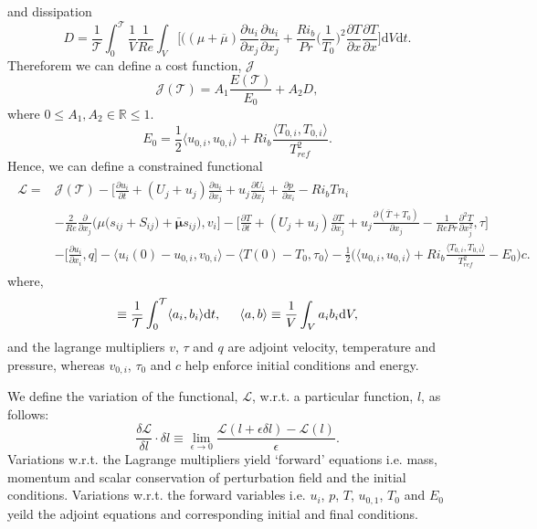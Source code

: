 \documentclass[preprint,12pt]{article}
\begin{document}
and dissipation
\begin{equation}
D=\frac{1}{\mathcal{T}}\int_{0}^{\mathcal{T}}\frac{1}{V}\frac{1}{Re}\int_V\Bigg[\Big((\mu+\overline{\mu})\frac{\partial u_{i}}{\partial x_j}\frac{\partial u_{i}}{\partial x_j}+\frac{Ri_b}{Pr}\Big(\frac{1}{T_0}\Big)^2{\frac{\partial T}{\partial x}\frac{\partial T}{\partial x}}\Bigg]\text{d}V\text{d}t.
\end{equation}
Thereforem we can define a cost function, $\mathcal{J}$
\begin{equation}
\mathcal{J}(\mathcal{T})=A_1\frac{E(\mathcal{T})}{E_0}+A_2D,
\end{equation}
where $0\le A_1,A_2\in\mathbb{R}\le 1$.
\begin{equation}
E_0=\frac{1}{2}\Big\langle u_{0,i},u_{0,i}\Big\rangle+Ri_b \frac{\langle T_{0,i},T_{0,i}\rangle}{T_{ref}^2}.
\end{equation}
Hence, we can define a constrained functional
\begin{align}\begin{split}
\mathcal{L}=&\mathcal{J}(\mathcal{T})-\Bigg[\frac{\partial{u_i}}{\partial{t}}+(U_j+u_j)\frac{\partial u_i}{\partial x_j} +u_j\frac{\partial U_i}{\partial x_j}+\frac{\partial p}{\partial x_i}-{Ri_bT}n_i\\&-{\frac{2}{Re}}{\frac{\partial}{\partial x_j}}\Big({\mu}\big(s_{ij}+S_{ij}\big)+\mathbf{\bar{\mu}}s_{ij}\Big),v_i\Bigg]-\Bigg[\frac{\partial{T}}{\partial{t}}+(U_j+u_j)\frac{\partial T}{\partial x_j} +u_j\frac{\partial(\overline{T}+T_0)}{\partial x_j}-\frac{1}{{Re }Pr} \frac{\partial^2T}{\partial x_j^2},\tau\Bigg]\\&-\Bigg[\frac{\partial u_i}{\partial x_i},q\Bigg]-\langle u_i(0)-u_{0,i},v_{0,i}\rangle-\langle T(0)-T_{0},\tau_{0}\rangle-\frac{1}{2}\Big(\Big\langle u_{0,i},u_{0,i}\Big\rangle+Ri_b \frac{\langle T_{0,i},T_{0,i}\rangle}{T_{ref}^2}-E_0\Big)c.
\end{split}\end{align}
where,
\begin{equation}
[a_i,b_i]\equiv\frac{1}{\mathcal{T}}\int_{0}^{\mathcal{T}}\langle a_i,b_i \rangle\text{d}t,\hspace{0.2in}\langle a,b \rangle\equiv \frac{1}{V}\int_Va_ib_i \text{d}V,
\end{equation}
and the lagrange multipliers $v$, $\tau$ and $q$ are adjoint velocity, temperature and pressure, whereas $v_{0,i}$, $\tau_0$ and $c$ help enforce initial conditions and energy.

We define the variation of the functional, $\mathcal{L}$, w.r.t. a particular function, $l$, as follows:
\begin{equation}
\frac{\delta \mathcal{L}}{\delta l}\cdot \delta l\equiv \lim\limits_{\epsilon \rightarrow 0}\frac{\mathcal{L}(l+\epsilon\delta l)-\mathcal{L}(l)}{\epsilon}.
\end{equation}
Variations w.r.t. the Lagrange multipliers yield `forward' equations i.e.  mass, momentum and scalar conservation of perturbation field and the initial conditions. Variations w.r.t. the forward variables i.e. $u_i$, $p$, $T$, $u_{0,1}$, $T_0$ and $E_0$ yeild the adjoint equations and corresponding initial and final conditions.
\end{document}

